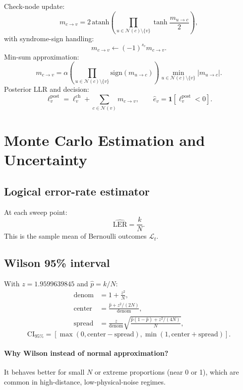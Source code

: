 \documentclass[11pt]{article}
\newcommand{\ind}[1]{\mathbf{1}\!\left[#1\right]}
\begin{document}
Check-node update:
\begin{equation}
m_{c\to v}=2\,\mathrm{atanh}\!\left(\prod_{u\in\mathcal N(c)\setminus\{v\}}\tanh\frac{m_{u\to c}}{2}\right),
\end{equation}
with syndrome-sign handling:
\begin{equation}
m_{c\to v}\leftarrow(-1)^{s_c}m_{c\to v}.
\end{equation}
Min-sum approximation:
\begin{equation}
m_{c\to v}=\alpha
\left(\prod_{u\in\mathcal N(c)\setminus\{v\}}\mathrm{sign}(m_{u\to c})\right)
\min_{u\in\mathcal N(c)\setminus\{v\}}|m_{u\to c}|.
\end{equation}
Posterior LLR and decision:
\begin{equation}
\ell_v^{\mathrm{post}}=\ell_v^{\mathrm{ch}}+\sum_{c\in\mathcal N(v)}m_{c\to v},\qquad
\hat e_v=\ind{\ell_v^{\mathrm{post}}<0}.
\end{equation}

\section{Monte Carlo Estimation and Uncertainty}
\subsection{Logical error-rate estimator}
At each sweep point:
\begin{equation}
\widehat{\mathrm{LER}}=\frac{k}{N}.
\end{equation}
This is the sample mean of Bernoulli outcomes $\mathcal L_t$.

\subsection{Wilson 95\% interval}
With $z=1.9599639845$ and $\hat p=k/N$:
\begin{align}
\mathrm{denom}&=1+\frac{z^2}{N},\\
\mathrm{center}&=\frac{\hat p+z^2/(2N)}{\mathrm{denom}},\\
\mathrm{spread}&=\frac{z}{\mathrm{denom}}
\sqrt{\frac{\hat p(1-\hat p)+z^2/(4N)}{N}},
\end{align}
\begin{equation}
\mathrm{CI}_{95\%}=
\left[\max(0,\mathrm{center}-\mathrm{spread}),\min(1,\mathrm{center}+\mathrm{spread})\right].
\end{equation}

\paragraph{Why Wilson instead of normal approximation?}
It behaves better for small $N$ or extreme proportions (near 0 or 1), which are common in high-distance, low-physical-noise regimes.
\end{document}
